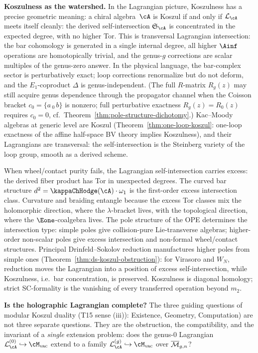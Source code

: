 \noindent\textbf{Koszulness as the watershed.}\enspace
In the Lagrangian picture, Koszulness has a precise geometric meaning:
a chiral algebra~$\cA$ is Koszul if and only if $\cL_\cA$ meets
itself cleanly: the derived self-intersection $\mathfrak{S}_\cA$ is
concentrated in the expected degree, with no higher Tor. This is
transversal Lagrangian intersection: the bar cohomology is generated
in a single internal degree, all higher $\Ainf$ operations are
homotopically trivial, and the genus-$g$ corrections are scalar
multiples of the genus-zero answer. In the physical language, the
bar-complex sector is perturbatively exact; loop corrections
renormalize but do not deform, and the $E_1$-coproduct $\Delta$ is
genus-independent. (The full $R$-matrix $R_g(z)$ may still acquire
genus dependence through the propagator channel when the Coisson
bracket $c_0 = \{a\,{}_0\,b\}$ is nonzero; full perturbative
exactness $R_g(z) = R_0(z)$ requires $c_0 = 0$,
cf.\ Theorem~\ref{thm:pole-structure-dichotomy}.)
Kac--Moody algebras at generic level are Koszul
(Theorem~\ref{thm:one-loop-koszul}: one-loop exactness of the
affine half-space BV theory implies Koszulness), and their
Lagrangians are transversal: the self-intersection is the
Steinberg variety of the loop group, smooth as a derived scheme.

When wheel/contact purity fails, the Lagrangian self-intersection
carries excess: the derived fiber product has Tor in unexpected
degrees. The curved bar structure
$d^2 = \kappaChHodge(\cA) \cdot \omega_1$ is the first-order excess
intersection class. Curvature and braiding entangle because the excess
Tor classes mix the holomorphic direction, where the $\lambda$-bracket
lives, with the topological direction, where the $\Eone$-coalgebra
lives. The pole structure of the OPE determines the intersection type:
simple poles give collision-pure Lie-transverse algebras; higher-order
non-scalar poles give excess intersection and non-formal wheel/contact
structures. Principal Drinfeld--Sokolov reduction manufactures higher
poles from simple ones (Theorem~\ref{thm:ds-koszul-obstruction}): for
Virasoro and $W_N$, reduction moves the Lagrangian into a position of
excess self-intersection, while Koszulness, i.e.\ bar concentration, is
preserved. Koszulness is diagonal homology; strict SC-formality is the
vanishing of every transferred operation beyond $m_2$.

\medskip

\noindent\textbf{Is the holographic Lagrangian complete?}\enspace
The three guiding questions of modular Koszul duality (T15 sense (iii)): Existence,
Geometry, Computation) are not three separate questions. They are
the obstruction, the compatibility, and the invariant of a
\emph{single} extension problem: does the genus-$0$ Lagrangian
$\cL_\cA^{(0)} \hookrightarrow \Mvac$ extend to a family
$\cL_\cA^{(g)} \hookrightarrow \Mvac$ over $\overline{\mathcal M}_{g,n}$?

